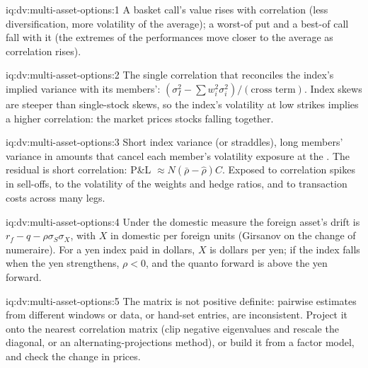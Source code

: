 \begin{solution}{iq:dv:multi-asset-options:1}
A basket call's value rises with correlation (less diversification, more volatility of the average); a worst-of put and a best-of
call fall with it (the extremes of the performances move closer to the average as correlation rises).
\end{solution}

\begin{solution}{iq:dv:multi-asset-options:2}
The single correlation that reconciles the index's implied variance with its members': $(\sigma_I^2-\sum w_i^2\sigma_i^2)/(\text{cross
term})$. Index skews are steeper than single-stock skews, so the index's volatility at low strikes implies a higher correlation: the
market prices stocks falling together.
\end{solution}

\begin{solution}{iq:dv:multi-asset-options:3}
Short index variance (or straddles), long members' variance in amounts that cancel each member's volatility exposure at the . The residual is short correlation: P\&L $\approx N(\bar\rho-\hat\rho)C$. Exposed to correlation spikes in sell-offs,
to the volatility of the weights and hedge ratios, and to transaction costs across many legs.
\end{solution}

\begin{solution}{iq:dv:multi-asset-options:4}
Under the domestic measure the foreign asset's drift is $r_f-q-\rho\sigma_S\sigma_X$, with $X$ in domestic per foreign units (Girsanov
on the change of numeraire). For a yen index paid in dollars, $X$ is dollars per yen; if the index falls when the yen strengthens,
$\rho<0$, and the quanto forward is above the yen forward.
\end{solution}

\begin{solution}{iq:dv:multi-asset-options:5}
The matrix is not positive definite: pairwise estimates from different windows or data, or hand-set entries, are inconsistent. Project
it onto the nearest correlation matrix (clip negative eigenvalues and rescale the diagonal, or an alternating-projections method), or
build it from a factor model, and check the change in prices.
\end{solution}

